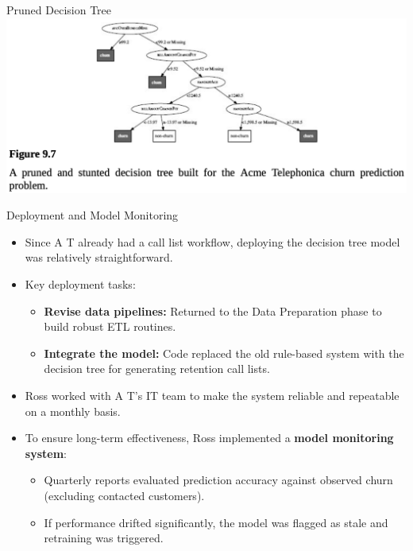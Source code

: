 \documentclass[aspectratio=169,xcolor=dvipsnames]{beamer}
\begin{document}
\begin{frame}{Pruned Decision Tree}
\centering
\includegraphics[scale=0.4]{images/stunted.png}
\end{frame}

\begin{frame}{Deployment and Model Monitoring}

\begin{itemize}
  \item Since A T already had a call list workflow, deploying the decision tree model was relatively straightforward.
  \item Key deployment tasks:
  \begin{itemize}
    \item \textbf{Revise data pipelines:} Returned to the Data Preparation phase to build robust ETL routines.
    \item \textbf{Integrate the model:} Code replaced the old rule-based system with the decision tree for generating retention call lists.
  \end{itemize}
  \item Ross worked with A T’s IT team to make the system reliable and repeatable on a monthly basis.
  \item To ensure long-term effectiveness, Ross implemented a \textbf{model monitoring system}:
  \begin{itemize}
    \item Quarterly reports evaluated prediction accuracy against observed churn (excluding contacted customers).
    \item If performance drifted significantly, the model was flagged as stale and retraining was triggered.
  \end{itemize}
\end{itemize}

\end{frame}
\end{document}
